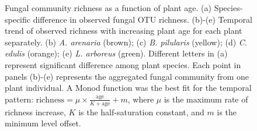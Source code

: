 \newpage
\begin{figure}[h]
	\centering
	\caption[Fungal community richness as a function of plant age.]
		{\hspace{1mm} 
		Fungal community richness as a function of plant age. (a) Species-specific difference in observed fungal OTU richness. 
		(b)-(e) Temporal trend of observed richness with increasing plant age for each plant separately. (b) \textit{A. arenaria} (brown); (c) \textit{B. pilularis} (yellow); (d) \textit{C. edulis} (orange); (e) \textit{L. arboreus} (green). 
		Different letters in (a) represent significant difference among plant species. Each point in panels (b)-(e) represents the aggregated fungal community from one plant individual. A Monod function was the best fit for the temporal pattern: $\text{richness} = \mu \times \tfrac{\text{age}}{K + \text{age}} + m$, where $\mu$ is the maximum rate of richness increase, $K$ is the half-saturation constant, and $m$ is the minimum level offset.}
	\label{fig:FunRichness}
\end{figure}



